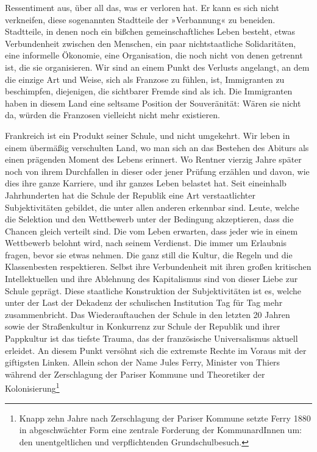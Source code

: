 Ressentiment aus, über all das, was er verloren hat. Er kann es
sich nicht verkneifen, diese sogenannten Stadtteile der
»Verbannung« zu beneiden. Stadtteile, in denen noch ein bißchen
gemeinschaftliches Leben besteht, etwas Verbundenheit zwischen den
Menschen, ein paar nichtstaatliche Solidaritäten, eine informelle
Ökonomie, eine Organisation, die noch nicht von denen getrennt ist,
die sie organisieren. Wir sind an einem Punkt des Verlusts
angelangt, an dem die einzige Art und Weise, sich als Franzose zu
fühlen, ist, Immigranten zu beschimpfen, diejenigen, die sichtbarer
Fremde sind als ich. Die Immigranten haben in diesem Land eine
seltsame Position der Souveränität: Wären sie nicht da, würden die
Franzosen vielleicht nicht mehr existieren.

\extrapar{}

Frankreich ist ein Produkt seiner Schule, und nicht umgekehrt. Wir
leben in einem übermäßig verschulten Land, wo man sich an das
Bestehen des Abiturs als einen prägenden Moment des Lebens
erinnert. Wo Rentner vierzig Jahre später noch von ihrem
Durchfallen in dieser oder jener Prüfung erzählen und davon, wie
dies ihre ganze Karriere, und ihr ganzes Leben belastet hat. Seit
eineinhalb Jahrhunderten hat die Schule der Republik eine Art
verstaatlichter Subjektivitäten gebildet, die unter allen anderen
erkennbar sind. Leute, welche die Selektion und den Wettbewerb
unter der Bedingung akzeptieren, dass die Chancen gleich verteilt
sind. Die vom Leben erwarten, dass jeder wie in einem Wettbewerb
belohnt wird, nach seinem Verdienst. Die immer um Erlaubnis fragen,
bevor sie etwas nehmen. Die ganz still die Kultur, die Regeln und
die Klassenbesten respektieren. Selbst ihre Verbundenheit mit ihren
großen kritischen Intellektuellen und ihre Ablehnung des
Kapitalismus sind von dieser Liebe zur Schule geprägt. Diese
staatliche Konstruktion der Subjektivitäten ist es, welche unter
der Last der Dekadenz der schulischen Institution Tag für Tag mehr
zusammenbricht. Das Wiederauftauchen der Schule in den letzten 20
Jahren sowie der Straßenkultur in Konkurrenz zur Schule der
Republik und ihrer Pappkultur ist das tiefste Trauma, das der
französische Universalismus aktuell erleidet. An diesem Punkt
versöhnt sich die extremste Rechte im Voraus mit der giftigsten
Linken. Allein schon der Name Jules Ferry, Minister von Thiers
während der Zerschlagung der Pariser Kommune und Theoretiker der
Kolonisierung\footnote{
Knapp zehn Jahre nach Zerschlagung der Pariser Kommune setzte
Ferry 1880 in abgeschwächter Form eine zentrale Forderung der
KommunardInnen um: den unentgeltlichen und verpflichtenden
Grundschulbesuch.
}%
